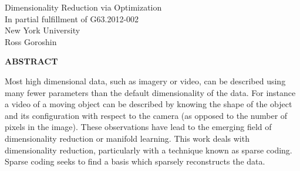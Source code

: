 \documentclass[12pt,a4paper]{article}
\begin{document}
\begin{center}
\thispagestyle{empty}
\Large Dimensionality Reduction via Optimization\\ 
\normalsize
\vspace{80mm}
In partial fulfillment of G63.2012-002\\
New York University \\
Ross Goroshin 
\end{center}

\newpage 
\begin{center}
{\bf ABSTRACT} 
\end{center}
Most high dimensional data, such as imagery or video, can be described using many fewer parameters than the default dimensionality of the data. For instance a video of a moving object can be described by knowing the shape of the object and its configuration with respect to the camera (as opposed to the number of pixels in the image). These observations have lead to the emerging field of dimensionality reduction or manifold learning. This work deals with dimensionality reduction, particularly with a technique known as sparse coding. Sparse coding seeks to find a basis which sparsely reconstructs the data. 
\newpage
\end{document}
